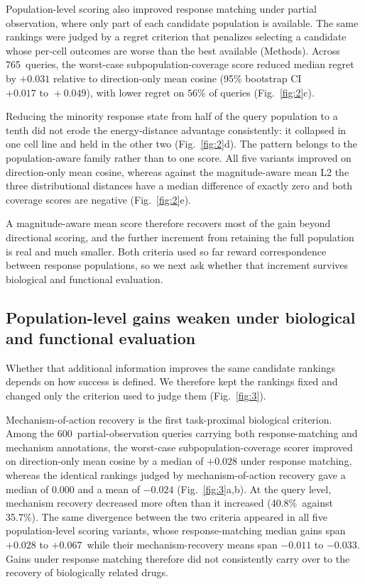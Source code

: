 \documentclass[11pt,letterpaper]{article}
\newcommand{\NALL}{765}                 %
\newcommand{\NMOA}{600}                 %
\newcommand{\REGRETALL}{+0.031}         %
\newcommand{\REGRETALLCI}{+0.017\text{ to }+0.049}   %
\newcommand{\REGRETALLFRAC}{56\%}       %
\newcommand{\CLASSAMED}{+0.028}         %
\newcommand{\CLASSBMED}{0.000}          %
\newcommand{\CLASSBMEAN}{-0.024}        %
\newcommand{\CLASSBWORSE}{40.8\%}       %
\newcommand{\CLASSBBETTER}{35.7\%}      %
\newcommand{\CLASSARANGE}{$+0.028$ to $+0.067$}   %
\newcommand{\CLASSBRANGE}{$-0.011$ to $-0.033$}   %
\begin{document}
Population-level scoring also improved response matching under partial observation, where only part of each candidate population is available. The same rankings were judged by a regret criterion that penalizes selecting a candidate whose per-cell outcomes are worse than the best available (Methods). Across \NALL\ queries, the worst-case subpopulation-coverage score reduced median regret by $\REGRETALL$ relative to direction-only mean cosine (95\% bootstrap CI $\REGRETALLCI$), with lower regret on $\REGRETALLFRAC$ of queries (Fig.~\ref{fig:2}c).

Reducing the minority response state from half of the query population to a tenth did not erode the energy-distance advantage consistently: it collapsed in one cell line and held in the other two (Fig.~\ref{fig:2}d). The pattern belongs to the population-aware family rather than to one score. All five variants improved on direction-only mean cosine, whereas against the magnitude-aware mean L2 the three distributional distances have a median difference of exactly zero and both coverage scores are negative (Fig.~\ref{fig:2}e).

A magnitude-aware mean score therefore recovers most of the gain beyond directional scoring, and the further increment from retaining the full population is real and much smaller. Both criteria used so far reward correspondence between response populations, so we next ask whether that increment survives biological and functional evaluation.

\subsection*{Population-level gains weaken under biological and functional evaluation}

Whether that additional information improves the same candidate rankings depends on how success is defined. We therefore kept the rankings fixed and changed only the criterion used to judge them (Fig.~\ref{fig:3}).

Mechanism-of-action recovery is the first task-proximal biological criterion. Among the \NMOA\ partial-observation queries carrying both response-matching and mechanism annotations, the worst-case subpopulation-coverage scorer improved on direction-only mean cosine by a median of $\CLASSAMED$ under response matching, whereas the identical rankings judged by mechanism-of-action recovery gave a median of $\CLASSBMED$ and a mean of $\CLASSBMEAN$ (Fig.~\ref{fig:3}a,b). At the query level, mechanism recovery decreased more often than it increased (\CLASSBWORSE\ against \CLASSBBETTER). The same divergence between the two criteria appeared in all five population-level scoring variants, whose response-matching median gains span \CLASSARANGE\ while their mechanism-recovery means span \CLASSBRANGE. Gains under response matching therefore did not consistently carry over to the recovery of biologically related drugs.
\end{document}
